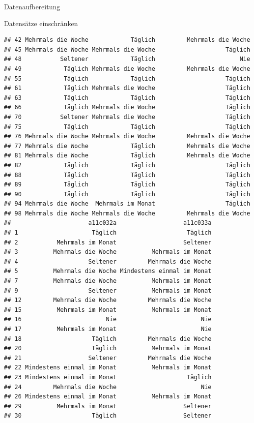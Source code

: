 \documentclass[ignorenonframetext,]{beamer}
\begin{document}
\begin{frame}[fragile]{Datenaufbereitung}
\begin{block}{Datensätze einschränken}
\begin{verbatim}
## 42 Mehrmals die Woche            Täglich         Mehrmals die Woche
## 45 Mehrmals die Woche Mehrmals die Woche                    Täglich
## 48           Seltener            Täglich                        Nie
## 49            Täglich Mehrmals die Woche         Mehrmals die Woche
## 55            Täglich            Täglich                    Täglich
## 61            Täglich Mehrmals die Woche                    Täglich
## 63            Täglich            Täglich                    Täglich
## 66            Täglich Mehrmals die Woche                    Täglich
## 70           Seltener Mehrmals die Woche                    Täglich
## 75            Täglich            Täglich                    Täglich
## 76 Mehrmals die Woche Mehrmals die Woche         Mehrmals die Woche
## 77 Mehrmals die Woche            Täglich         Mehrmals die Woche
## 81 Mehrmals die Woche            Täglich         Mehrmals die Woche
## 82            Täglich            Täglich                    Täglich
## 88            Täglich            Täglich                    Täglich
## 89            Täglich            Täglich                    Täglich
## 90            Täglich            Täglich                    Täglich
## 94 Mehrmals die Woche  Mehrmals im Monat                    Täglich
## 98 Mehrmals die Woche Mehrmals die Woche         Mehrmals die Woche
##                      a11c032a                   a11c033a
## 1                     Täglich                    Täglich
## 2           Mehrmals im Monat                   Seltener
## 3          Mehrmals die Woche          Mehrmals im Monat
## 4                    Seltener         Mehrmals die Woche
## 5          Mehrmals die Woche Mindestens einmal im Monat
## 7          Mehrmals die Woche          Mehrmals im Monat
## 9                    Seltener          Mehrmals im Monat
## 12         Mehrmals die Woche         Mehrmals die Woche
## 15          Mehrmals im Monat          Mehrmals im Monat
## 16                        Nie                        Nie
## 17          Mehrmals im Monat                        Nie
## 18                    Täglich         Mehrmals die Woche
## 20                    Täglich          Mehrmals im Monat
## 21                   Seltener         Mehrmals die Woche
## 22 Mindestens einmal im Monat          Mehrmals im Monat
## 23 Mindestens einmal im Monat                    Täglich
## 24         Mehrmals die Woche                        Nie
## 26 Mindestens einmal im Monat          Mehrmals im Monat
## 29          Mehrmals im Monat                   Seltener
## 30                    Täglich                   Seltener

\end{verbatim}
\end{block}
\end{frame}
\end{document}
